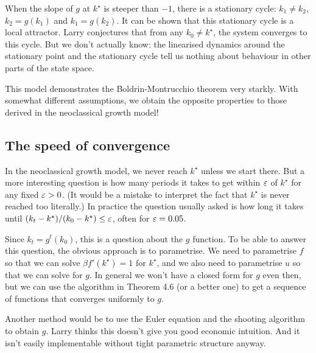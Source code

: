 \documentclass[11pt,letterpaper,reqno,oneside]{article}
\begin{document}
When the slope of $g$ at $k^\star$ is steeper than $-1$, there is a stationary cycle: $k_1 \neq k_2$, $k_2 = g(k_1)$ and $k_1 = g(k_2)$. It can be shown that this stationary cycle is a local attractor. Larry conjectures that from any $k_0 \neq k^\star$, the system converges to this cycle. But we don't actually know: the linearised dynamics around the stationary point and the stationary cycle tell us nothing about behaviour in other parts of the state space.

This model demonstrates the Boldrin-Montrucchio theorem very starkly. With somewhat different assumptions, we obtain the opposite properties to those derived in the neoclassical growth model!



\subsection{The speed of convergence}
\label{sec:05Oct2015:speed_of_convergence}

In the neoclassical growth model, we never reach $k^\star$ unless we start there. But a more interesting question is how many periods it takes to get within $\varepsilon$ of $k^\star$ for any fixed $\varepsilon>0$. (It would be a mistake to interpret the fact that $k^\star$ is never reached too literally.) In practice the question usually asked is how long it takes until $(k_t - k^\star) / (k_0 - k^\star ) \leq \varepsilon$, often for $\varepsilon = 0.05$.

Since $k_t = g^t(k_0)$, this is a question about the $g$ function. To be able to answer this question, the obvious approach is to parametrise. We need to parametrise $f$ so that we can solve $\beta f'(k^\star) = 1$ for $k^\star$, and we also need to parametrise $u$ so that we can solve for $g$. In general we won't have a closed form for $g$ even then, but we can use the algorithm in Theorem 4.6 (or a better one) to get a sequence of functions that converges uniformly to $g$.

Another method would be to use the Euler equation and the shooting algorithm to obtain $g$. Larry thinks this doesn't give you good economic intuition. And it isn't easily implementable without tight parametric structure anyway.
\end{document}
